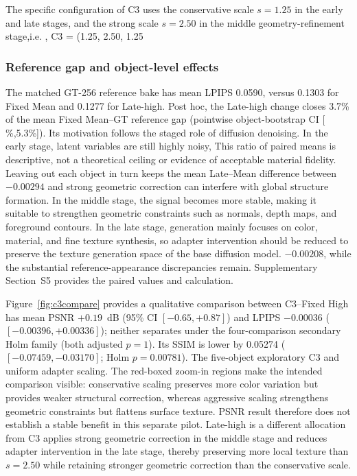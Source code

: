 \documentclass[times,twocolumn,final]{elsarticle}
\providecommand{\DIFadd}[1]{{\protect\color{blue} \sf #1}} %
\providecommand{\DIFdel}[1]{{\protect\color{red} \scriptsize #1}} %
\providecommand{\DIFaddbegin}{} %
\providecommand{\DIFaddend}{} %
\providecommand{\DIFdelbegin}{} %
\providecommand{\DIFdelend}{} %
\begin{document}
\DIFdelbegin \DIFdel{The specific configuration of C3 uses the conservative scale $s = 1.25$ in the early and late stages, and the strong scale $s = 2.50$ in the middle geometry-refinement stage,i.e. , C3 = (1.25, 2.50, 1.25}\DIFdelend \DIFaddbegin \subsubsection{Reference gap and object-level effects}
\DIFadd{The matched GT-256 reference bake has mean LPIPS 0.0590, versus 0.1303 for Fixed Mean and 0.1277 for Late-high. Post hoc, the Late-high change closes 3.7\% of the mean Fixed Mean--GT reference gap (pointwise object-bootstrap CI }[\DIFadd{2.3\%,5.3\%}]\DIFaddend ). \DIFdelbegin \DIFdel{Its motivation follows the staged role of diffusion denoising. In the early stage, latent variables are still highly noisy, }\DIFdelend \DIFaddbegin \DIFadd{This ratio of paired means is descriptive, not a theoretical ceiling or evidence of acceptable material fidelity. Leaving out each object in turn keeps the mean Late--Mean difference between $-0.00294$ }\DIFaddend and \DIFdelbegin \DIFdel{strong geometric correction can interfere with global structure formation. In the middle stage, the signal becomes more stable, making it suitable to strengthen geometric constraints such as normals, depth maps, and foreground contours. In the late stage, generation mainly focuses on color, material, and fine texture synthesis, so adapter intervention should be reduced to preserve the texture generation space of the base diffusion model.
}\DIFdelend \DIFaddbegin \DIFadd{$-0.00208$, while the substantial reference-appearance discrepancies remain. Supplementary Section~S5 provides the paired values and calculation.
}\DIFaddend

\DIFdelbegin \DIFdel{Figure~\ref{fig:c3compare} provides a qualitative comparison between }\DIFdelend \DIFaddbegin \DIFadd{C3--Fixed High has mean PSNR $+0.19$~dB (95\% CI $[-0.65,+0.87]$) and LPIPS $-0.00036$ ($[-0.00396,+0.00336]$); neither separates under the four-comparison secondary Holm family (both adjusted $p=1$). Its SSIM is lower by 0.05274 ($[-0.07459,-0.03170]$; Holm $p=0.00781$). The five-object exploratory }\DIFaddend C3 \DIFdelbegin \DIFdel{and uniform adapter scaling. The red-boxed zoom-in regions make the intended comparison visible: conservative scaling preserves more color variation but provides weaker structural correction, whereas aggressive scaling strengthens geometric constraints but flattens surface texture. }\DIFdelend \DIFaddbegin \DIFadd{PSNR result therefore does not establish a stable benefit in this separate pilot. Late-high is a different allocation from }\DIFaddend C3\DIFdelbegin \DIFdel{applies strong geometric correction in the middle stage and reduces adapter intervention in the late stage, thereby preserving more local texture than $s = 2.50$ while retaining stronger geometric correction than the conservative scale. }%
\end{document}
